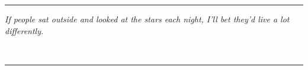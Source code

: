 \mbox{}
\vspace{.75in}
\hrule

\vspace{2in}


\begin{centering}
	\hspace{.25in}
	\parbox{5in}{
		\noindent
		\textit{If people sat outside and looked at the stars each night, I'll bet they'd live a lot differently.}
		\vspace{3pt}

		\begin{flushright}
			{}\\
		\end{flushright}
	}
\end{centering}
\vspace{2.25in}
\hrule
\vfill

\textwidth 5.750in \textheight=8.50in \headheight 0.0625in \topmargin 0.0in %
